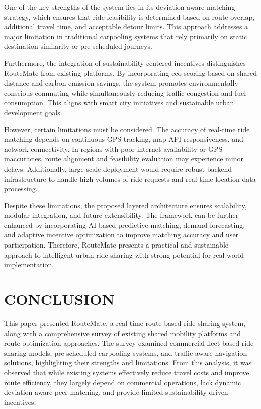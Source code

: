 \documentclass[conference]{IEEEtran}
\begin{document}
One of the key strengths of the system lies in its deviation-aware matching strategy, which ensures that ride feasibility is determined based on route overlap, additional travel time, and acceptable detour limits. This approach addresses a major limitation in traditional carpooling systems that rely primarily on static destination similarity or pre-scheduled journeys.

Furthermore, the integration of sustainability-centered incentives distinguishes RouteMate from existing platforms. By incorporating eco-scoring based on shared distance and carbon emission savings, the system promotes environmentally conscious commuting while simultaneously reducing traffic congestion and fuel consumption. This aligns with smart city initiatives and sustainable urban development goals.

However, certain limitations must be considered. The accuracy of real-time ride matching depends on continuous GPS tracking, map API responsiveness, and network connectivity. In regions with poor internet availability or GPS inaccuracies, route alignment and feasibility evaluation may experience minor delays. Additionally, large-scale deployment would require robust backend infrastructure to handle high volumes of ride requests and real-time location data processing.

Despite these limitations, the proposed layered architecture ensures scalability, modular integration, and future extensibility. The framework can be further enhanced by incorporating AI-based predictive matching, demand forecasting, and adaptive incentive optimization to improve matching accuracy and user participation. Therefore, RouteMate presents a practical and sustainable approach to intelligent urban ride sharing with strong potential for real-world implementation.

\section{CONCLUSION}

This paper presented RouteMate, a real-time route-based ride-sharing system, along with a comprehensive survey of existing shared mobility platforms and route optimization approaches. The survey examined commercial fleet-based ride-sharing models, pre-scheduled carpooling systems, and traffic-aware navigation solutions, highlighting their strengths and limitations. From this analysis, it was observed that while existing systems effectively reduce travel costs and improve route efficiency, they largely depend on commercial operations, lack dynamic deviation-aware peer matching, and provide limited sustainability-driven incentives.
\end{document}
